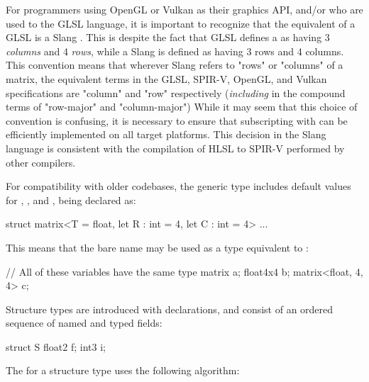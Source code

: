 \begin{Note}
For programmers using OpenGL or Vulkan as their graphics API, and/or who are used to the GLSL language,
it is important to recognize that the equivalent of a GLSL  is a Slang .
This is despite the fact that GLSL defines a  as having 3 \emph{columns} and 4 \emph{rows}, while a Slang  is defined as having 3 rows and 4 columns.
This convention means that wherever Slang refers to "rows" or "columns" of a matrix, the equivalent terms in the GLSL, SPIR-V, OpenGL, and Vulkan specifications are "column" and "row" respectively (\emph{including} in the compound terms of "row-major" and "column-major")
While it may seem that this choice of convention is confusing, it is necessary to ensure that subscripting with \Char{[]} can be efficiently implemented on all target platforms.
This decision in the Slang language is consistent with the compilation of HLSL to SPIR-V performed by other compilers.
\end{Note}


For compatibility with older codebases, the generic  type includes default values for , , and , being declared as:

\begin{codeblock}
struct matrix<T = float, let R : int = 4, let C : int = 4> { ... }
\end{codeblock}

This means that the bare name  may be used as a type equivalent to :

\begin{codeblock}
// All of these variables have the same type
matrix a;
float4x4 b;
matrix<float, 4, 4> c;
\end{codeblock}


Structure types are introduced with  declarations, and consist of an ordered sequence of named and typed fields:

\begin{codeblock}
struct S
{
    float2 f;
    int3 i;
}
\end{codeblock}


The  for a structure type uses the following algorithm:


